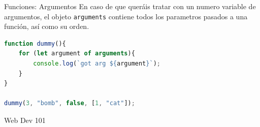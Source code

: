 \documentclass{beamer}
\begin{document}
\begin{frame}[fragile]{Funciones: Argumentos}
En caso de que queráis tratar con un numero variable de argumentos, el objeto {\verb|arguments|} contiene todos los parametros pasados a una función, así como su orden.

\begin{lstlisting}[language=JavaScript]
function dummy(){
    for (let argument of arguments){
        console.log(`got arg ${argument}`);
    }
}

dummy(3, "bomb", false, [1, "cat"]);
\end{lstlisting}
\end{frame}

\begin{frame}{Web Dev 101}
    
\end{frame}
\end{document}
